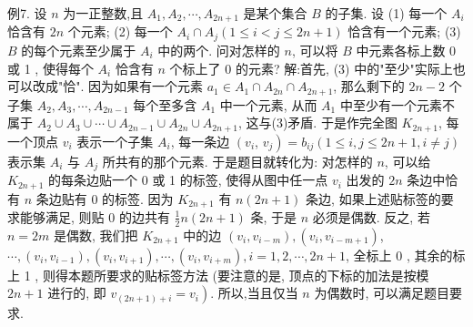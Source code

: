 例7. 设 $n$ 为一正整数,且 $A_1, A_2, \cdots, A_{2 n+1}$ 是某个集合 $B$ 的子集.
设
(1) 每一个 $A_i$ 恰含有 $2 n$ 个元素;
(2) 每一个 $A_i \cap A_j(1 \leqslant i<j \leqslant 2 n+1)$ 恰含有一个元素;
(3) $B$ 的每个元素至少属于 $A_i$ 中的两个.
问对怎样的 $n$, 可以将 $B$ 中元素各标上数 0 或 1 , 使得每个 $A_i$ 恰含有 $n$ 个标上了 0 的元素?
解:首先, (3) 中的"至少"实际上也可以改成"恰". 因为如果有一个元素 $a_1 \in A_1 \cap A_{2 n} \cap A_{2 n+1}$, 那么剩下的 $2 n-2$ 个子集 $A_2, A_3, \cdots, A_{2 n-1}$ 每个至多含 $A_1$ 中一个元素, 从而 $A_1$ 中至少有一个元素不属于 $A_2 \cup A_3 \cup \cdots \cup A_{2 n-1} \cup A_{2 n} \cup A_{2 n+1}$, 这与(3)矛盾.
于是作完全图 $K_{2 n+1}$, 每一个顶点 $v_i$ 表示一个子集 $A_i$, 每一条边 $\left(v_i\right.$, $\left.v_j\right)=b_{i j}(1 \leqslant i, j \leqslant 2 n+1, i \neq j)$ 表示集 $A_i$ 与 $A_j$ 所共有的那个元素.
于是题目就转化为: 对怎样的 $n$, 可以给 $K_{2 n+1}$ 的每条边贴一个 0 或 1 的标签, 使得从图中任一点 $v_i$ 出发的 $2 n$ 条边中恰有 $n$ 条边贴有 0 的标签.
因为 $K_{2 n+1}$ 有 $n(2 n+1)$ 条边, 如果上述贴标签的要求能够满足, 则贴 0 的边共有 $\frac{1}{2} n(2 n+1)$ 条, 于是 $n$ 必须是偶数.
反之, 若 $n=2 m$ 是偶数, 我们把 $K_{2 n+1}$ 中的边 $\left(v_i, v_{i-m}\right),\left(v_i, v_{i-m+1}\right)$, $\cdots,\left(v_i, v_{i-1}\right),\left(v_i, v_{i+1}\right), \cdots,\left(v_i, v_{i+m}\right), i=1,2, \cdots, 2 n+1$, 全标上 0 , 其余的标上 1 , 则得本题所要求的贴标签方法 (要注意的是, 顶点的下标的加法是按模 $2 n+1$ 进行的, 即 $\left.v_{(2 n+1)+i}=v_i\right)$.
所以,当且仅当 $n$ 为偶数时, 可以满足题目要求.




